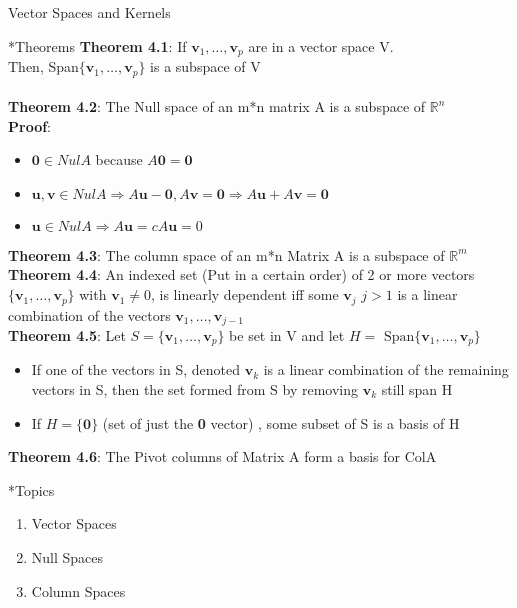 \documentclass[a4paper, 12pt]{article}
\begin{document}
\begin{section}{Vector Spaces and Kernels}
\begin{subsection}*{Theorems}
\textbf{Theorem 4.1}: If $\textbf{v}_{1},\dots,\textbf{v}_{p}$ are in a
vector space V.\\
Then, Span$\{\textbf{v}_{1},\dots,\textbf{v}_{p}\}$
is a subspace of V\\
\\
\textbf{Theorem 4.2}: The Null space of an m*n matrix A is a subspace
of $\mathbb{R}^{n}$\\
\textbf{Proof}:
\begin{itemize}
\item{$\textbf{0}\in NulA$ because $A\textbf{0}=\textbf{0}$}
\item{$\textbf{u},\textbf{v}\in NulA \Rightarrow A\textbf{u}-\textbf{0},
A\textbf{v}=\textbf{0}\Rightarrow A\textbf{u}+A\textbf{v}=\textbf{0}$}
\item{$\textbf{u}\in NulA \Rightarrow A\textbf{u}=cA\textbf{u}=0$}
\end{itemize}
\textbf{Theorem 4.3}:
The column space of an m*n Matrix A is a subspace of $\mathbb{R}^{m}$
\\
\textbf{Theorem 4.4}: An indexed set (Put in a certain order) of 2 or
more vectors $\{\textbf{v}_{1}, \dots, \textbf{v}_{p}\}$ with 
$\textbf{v}_{1}\neq 0$, is linearly dependent iff some $\textbf{v}_{j}$ 
$j>1$ is a linear combination of the vectors $\textbf{v}_{1},\dots,
\textbf{v}_{j-1}$
\\ \noindent\textbf{Theorem 4.5}: Let $S=\{\textbf{v}_{1},\dots,
\textbf{v}_{p}\}$ be set in V and let $H=\mbox{ Span}\{
\textbf{v}_{1},\dots,\textbf{v}_{p}\}$
\begin{itemize}
\item{If one of the vectors in S, denoted $\textbf{v}_{k}$ is a 
linear combination of the remaining vectors in S, then the set
 formed from S by removing $\textbf{v}_{k}$ still span H}
\item{If $H=\{\textbf{0\}}$ (set of just the \textbf{0} vector)
, some subset of S is a basis of H} 
\end{itemize}
\noindent\textbf{Theorem 4.6}: The Pivot columns of Matrix A form a basis for ColA
\end{subsection}
\begin{subsection}*{Topics}
\begin{enumerate}
\item{Vector Spaces}
\item{Null Spaces}
\item{Column Spaces}

\end{enumerate}
\end{subsection}
\end{section}
\end{document}
